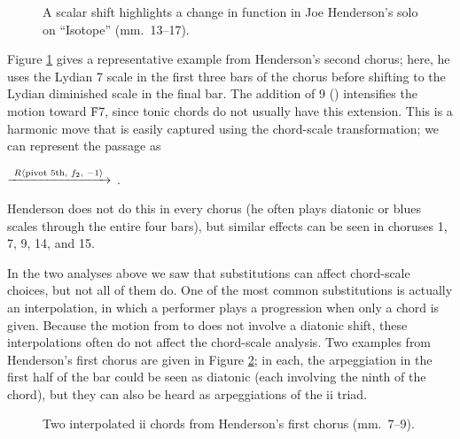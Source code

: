 \begin{figure}[tbp]
  \caption[A scalar shift highlights a change in function in Joe Henderson's
    solo on ``Isotope.'']{A scalar shift highlights a change in function in Joe
    Henderson's solo on ``Isotope'' (mm.~13--17).}
  \label{csa:henderson-scale-shift}
\end{figure}

Figure \ref{csa:henderson-scale-shift} gives a representative example from
Henderson's second chorus; here, he uses the Lydian \flat{}7 scale in the first
three bars of the chorus before shifting to the Lydian diminished scale in the
final bar. The addition of \flat{}9 (\Dflat) intensifies the motion toward
\h{F7}, since tonic chords do not usually have this extension. This is a
harmonic move that is easily captured using the chord-scale transformation; we
can represent the passage as \\
{\centering
   $\xrightarrow{\text{ \mbox{\ensuremath{R\langle}pivot 5th, $f_2$, $-1$\ensuremath{\rangle}} }}$
  . \par}
\noindent Henderson does not do this in every chorus (he
often plays diatonic or blues scales through the entire four bars), but
similar effects can be seen in choruses 1, 7, 9, 14, and 15.

In the two analyses above we saw that substitutions can affect chord-scale
choices, but not all of them do. One of the most common substitutions is
actually an interpolation, in which a performer plays a \tf progression when
only a \V chord is given. Because the motion from \ii to \V does not involve a
diatonic shift, these interpolations often do not affect the chord-scale
analysis. Two examples from Henderson's first chorus are given in
Figure \ref{csa:ii7-interpolation}; in each, the arpeggiation in the first
half of the bar could be seen as diatonic (each involving the ninth of the \V
chord), but they can also be heard as arpeggiations of the ii triad.

\begin{figure}[tbp]
  \caption[Two interpolated \ii chords from Henderson's first chorus.]{Two
    interpolated ii chords from Henderson's first chorus (mm.~7--9).}
  \label{csa:ii7-interpolation}
\end{figure}

